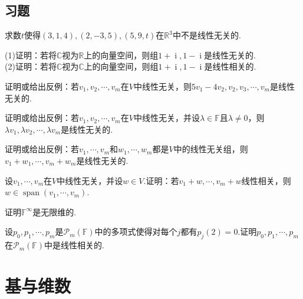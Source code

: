 \documentclass[lang=cn, zihao=5]{elegantbook}
\newcommand{\R}{\mathbb{R}}
\newcommand{\C}{\mathbb{C}}
\newcommand{\F}{\mathbb{F}}
\DeclareMathOperator{\spn}{span}
\DeclareMathOperator{\ic}{i}
\begin{document}
\subsection*{习题}

\begin{exercise}
	求数$t$使得$(3,1,4),(2,-3,5),(5,9,t)$在$\R ^{3}$中不是线性无关的.
\end{exercise}

\begin{exercise}
	(1)证明：若将$\C$视为$\R$上的向量空间，则组$1+\ic ,1-\ic $是线性无关的. \\
	(2)证明：若将$\C$视为$\C$上的向量空间，则组$1+\ic ,1-\ic $是线性相关的.
\end{exercise}

\begin{exercise}
	证明或给出反例：若$v_1,v_2, \cdots ,v_m$在$V$中线性无关，则$5v_1-4v_2,v_2,v_3, \cdots ,v_m$是线性无关的.
\end{exercise}

\begin{exercise}
	证明或给出反例：若$v_1,v_2, \cdots ,v_m$在$V$中线性无关，并设$\lambda \in \F$且$\lambda \neq 0$，则$\lambda v_1,\lambda v_2,\cdots ,\lambda v_m$是线性无关的.
\end{exercise}

\begin{exercise}
	证明或给出反例：若$v_1, \cdots ,v_m$和$w_1,\cdots ,w_m$都是$V$中的线性无关组，则$v_1+w_1, \cdots ,v_m+w_m$是线性无关的.
\end{exercise}

\begin{exercise}
	设$v_1, \cdots ,v_m$在$V$中线性无关，并设$w \in V$.证明：若$v_1+w, \cdots ,v_m+w$线性相关，则$w \in \spn (v_1, \cdots ,v_m)$.
\end{exercise}

\begin{exercise}
	证明$\F ^{\infty}$是无限维的.
\end{exercise}

\begin{exercise}
	设$p_0,p_1, \cdots ,p_m$是$\mathcal{P}_m (\F)$中的多项式使得对每个$j$都有$p_{j}(2)=0$.证明$p_0,p_1, \cdots ,p_m$在$\mathcal{P}_m (\F)$中是线性相关的.
\end{exercise}

\newpage
\section{基与维数}
\end{document}
